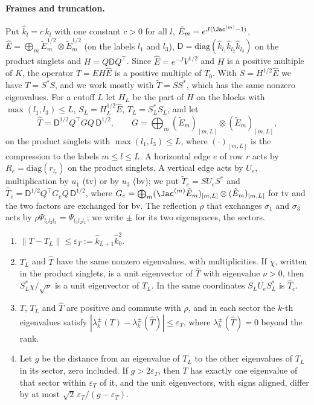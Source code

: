 \paragraph{Frames and truncation.}
Put $\hat k_l=c\,k_l$ with one constant $c>0$ for all $l$, $\tilde E_m=e^{J(\Jac^{(m)}-1)}$, $\hat E=\bigoplus_m\tilde E_m^{1/2}\otimes\tilde E_m^{1/2}$ (on
the labels $l_1$ and $l_3$), $\mathsf D=\mathrm{diag}(\hat k_{l_1}\hat k_{l_2}\hat k_{l_3})$ on the product singlets and $H=Q\mathsf DQ^\top$. Since
$\hat E=e^{-J}V^{1/2}$ and $H$ is a positive multiple of $K$, the operator $T=\hat EH\hat E$ is a positive multiple of $T_0$. With $S=H^{1/2}\hat E$ we
have $T=S^*S$, and we work mostly with $\tilde T=SS^*$, which has the same nonzero eigenvalues. For a cutoff $L$ let $H_L$ be the part of $H$ on the
blocks with $\max(l_1,l_3)\le L$, $S_L=H_L^{1/2}\hat E$, $T_L=S_L^*S_L$, and let
\[
\hat T=\mathsf D^{1/2}Q^\top GQ\,\mathsf D^{1/2},\qquad G=\bigoplus_m(\tilde E_m)_{[m,L]}\otimes(\tilde E_m)_{[m,L]},
\]
on the product singlets with $\max(l_1,l_3)\le L$, where $(\cdot)_{[m,L]}$ is the compression to the labels $m\le l\le L$. A horizontal edge $e$ of row
$r$ acts by $R_e=\mathrm{diag}(r_{l_r})$ on the product singlets. A vertical edge acts by $U_e$, multiplication by $u_1$ (tv) or by $u_3$ (bv); we put
$\tilde T_e=SU_eS^*$ and $\hat T_e=\mathsf D^{1/2}Q^\top G_eQ\,\mathsf D^{1/2}$, where $G_e=\bigoplus_m(\Jac^{(m)}\tilde E_m)_{[m,L]}\otimes(\tilde E_m)_{[m,L]}$
for tv and the two factors are exchanged for bv. The reflection $\rho$ that exchanges $\sigma_1$ and $\sigma_3$ acts by $\rho\Psi_{l_1l_2l_3}=\Psi_{l_3l_2l_1}$;
we write $\pm$ for its two eigenspaces, the sectors.

\begin{lemma}\label{lem:rhtrunc}
\begin{enumerate}
\item[(i)] $\|T-T_L\|\le\varepsilon_T:=\hat k_{L+1}\hat k_0^2$.
\item[(ii)] $T_L$ and $\hat T$ have the same nonzero eigenvalues, with multiplicities. If $\chi$, written in the product singlets, is a unit eigenvector
of $\hat T$ with eigenvalue $\nu>0$, then $S_L^*\chi/\sqrt\nu$ is a unit eigenvector of $T_L$. In the same coordinates $S_LU_eS_L^*$ is $\hat T_e$.
\item[(iii)] $T$, $T_L$ and $\hat T$ are positive and commute with $\rho$, and in each sector the $k$-th eigenvalues satisfy
$|\lambda_k^\pm(T)-\lambda_k^\pm(\hat T)|\le\varepsilon_T$, where $\lambda_k^\pm(\hat T)=0$ beyond the rank.
\item[(iv)] Let $g$ be the distance from an eigenvalue of $T_L$ to the other eigenvalues of $T_L$ in its sector, zero included. If $g>2\varepsilon_T$,
then $T$ has exactly one eigenvalue of that sector within $\varepsilon_T$ of it, and the unit eigenvectors, with signs aligned, differ by at most
$\sqrt2\,\varepsilon_T/(g-\varepsilon_T)$.
\end{enumerate}
\end{lemma}

